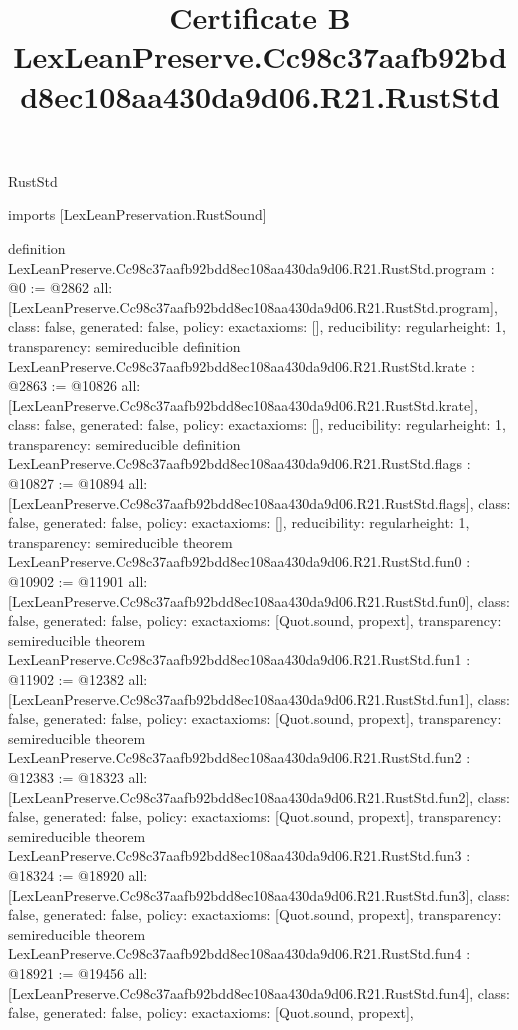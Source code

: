 \begin{lexlean}{RustStd}
\title{Certificate B LexLeanPreserve.Cc98c37aafb92bdd8ec108aa430da9d06.R21.RustStd}
\begin{coremodule}
imports [LexLeanPreservation.RustSound]

definition LexLeanPreserve.Cc98c37aafb92bdd8ec108aa430da9d06.R21.RustStd.program : @0 := @2862 {
  all: [LexLeanPreserve.Cc98c37aafb92bdd8ec108aa430da9d06.R21.RustStd.program],
  class: false,
  generated: false,
  policy: exact{axioms: []},
  reducibility: regular{height: 1},
  transparency: semireducible
}
definition LexLeanPreserve.Cc98c37aafb92bdd8ec108aa430da9d06.R21.RustStd.krate : @2863 := @10826 {
  all: [LexLeanPreserve.Cc98c37aafb92bdd8ec108aa430da9d06.R21.RustStd.krate],
  class: false,
  generated: false,
  policy: exact{axioms: []},
  reducibility: regular{height: 1},
  transparency: semireducible
}
definition LexLeanPreserve.Cc98c37aafb92bdd8ec108aa430da9d06.R21.RustStd.flags : @10827 := @10894 {
  all: [LexLeanPreserve.Cc98c37aafb92bdd8ec108aa430da9d06.R21.RustStd.flags],
  class: false,
  generated: false,
  policy: exact{axioms: []},
  reducibility: regular{height: 1},
  transparency: semireducible
}
theorem LexLeanPreserve.Cc98c37aafb92bdd8ec108aa430da9d06.R21.RustStd.fun0 : @10902 := @11901 {
  all: [LexLeanPreserve.Cc98c37aafb92bdd8ec108aa430da9d06.R21.RustStd.fun0],
  class: false,
  generated: false,
  policy: exact{axioms: [Quot.sound, propext]},
  transparency: semireducible
}
theorem LexLeanPreserve.Cc98c37aafb92bdd8ec108aa430da9d06.R21.RustStd.fun1 : @11902 := @12382 {
  all: [LexLeanPreserve.Cc98c37aafb92bdd8ec108aa430da9d06.R21.RustStd.fun1],
  class: false,
  generated: false,
  policy: exact{axioms: [Quot.sound, propext]},
  transparency: semireducible
}
theorem LexLeanPreserve.Cc98c37aafb92bdd8ec108aa430da9d06.R21.RustStd.fun2 : @12383 := @18323 {
  all: [LexLeanPreserve.Cc98c37aafb92bdd8ec108aa430da9d06.R21.RustStd.fun2],
  class: false,
  generated: false,
  policy: exact{axioms: [Quot.sound, propext]},
  transparency: semireducible
}
theorem LexLeanPreserve.Cc98c37aafb92bdd8ec108aa430da9d06.R21.RustStd.fun3 : @18324 := @18920 {
  all: [LexLeanPreserve.Cc98c37aafb92bdd8ec108aa430da9d06.R21.RustStd.fun3],
  class: false,
  generated: false,
  policy: exact{axioms: [Quot.sound, propext]},
  transparency: semireducible
}
theorem LexLeanPreserve.Cc98c37aafb92bdd8ec108aa430da9d06.R21.RustStd.fun4 : @18921 := @19456 {
  all: [LexLeanPreserve.Cc98c37aafb92bdd8ec108aa430da9d06.R21.RustStd.fun4],
  class: false,
  generated: false,
  policy: exact{axioms: [Quot.sound, propext]},
}
\end{coremodule}
\end{lexlean}
